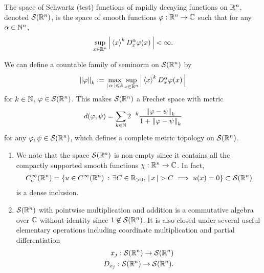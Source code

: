 \documentclass[12pt]{article}
\begin{document}
\begin{fdefinition}
    The space of Schwartz (test) functions of rapidly decaying functions on $\R^n$, denoted $\sch(\R^n)$, is the space of smooth functions $\varphi : \R^n \to \C$ such that for any $\alpha \in \N^n$, 
    \begin{align}
    \sup_{x \in \R^n} \abs{\sym[x]^k D^\alpha_x \varphi(x)} < \infty. 
    \end{align}

    
    We can define a countable family of seminorm on $\sch(\R^n)$ by 
    \begin{align}
    \norm[\varphi]_k := \max_{\abs{\alpha} \leq k} \sup_{x \in \R^n} \abs{\sym[x]^k D^\alpha_x \varphi(x)}
    \end{align}
    for $k \in \N$, $\varphi \in \sch(\R^n)$. This makes $\sch(\R^n)$ a Frechet space with metric 
    \begin{align*}
    d(\varphi, \psi) = \sum_{k \in \N} 2^{-k} \frac{\norm[\varphi - \psi]_k}{1 + \norm[\varphi - \psi]_k} 
    \end{align*}
    for any $\varphi, \psi \in \sch(\R^n)$, which defines a complete metric topology on $\sch(\R^n)$. 
\end{fdefinition}
\begin{rem} \hfill 
    \begin{enumerate}
        \item     We note that the space $\sch(\R^n)$ is non-empty since it contains all the compactly supported smooth functions $\chi : \R^n \to \C$. In fact, 
        \begin{align*}
        C^\infty_c(\R^n) = \set{u \in C^\infty(\R^n) \wh \exists C \in \R_{> 0}, \, \abs{x} > C \implies u(x) = 0} \subset \sch(\R^n)
        \end{align*}
        is a dense inclusion. 
        
        \item $\sch(\R^n)$ with pointwise multiplication and addition is a commutative algebra over $\C$ without identity since $1 \not\in \sch(\R^n)$. It is also closed under several useful elementary operations including coordinate multiplication and partial differentiation
        \begin{align*}
        x_j : \sch(\R^n) \to \sch(\R^n) \\
        D_{x_j} : \sch(\R^n) \to \sch(\R^n). 
        \end{align*}
        
    \end{enumerate}
\end{rem}
\end{document}
